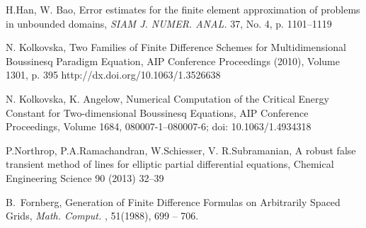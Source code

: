 \documentclass[12pt]{article}
\theoremstyle{theorem}
\theoremstyle{defi}
\begin{document}
\begin{thebibliography}{99}
  H.Han, W. Bao, Error estimates for the finite element approximation of problems in unbounded domains,  {\it SIAM J. NUMER. ANAL.} 37, No. 4, p. 1101–1119

 N. Kolkovska, Two Families of Finite Difference Schemes for Multidimensional Boussinesq Paradigm Equation, AIP Conference Proceedings (2010), Volume 1301, p. 395 http://dx.doi.org/10.1063/1.3526638

 N. Kolkovska, K. Angelow, Numerical Computation of the Critical Energy Constant for Two-dimensional Boussinesq Equations,  AIP Conference Proceedings, Volume 1684, 080007-1–080007-6; doi: 10.1063/1.4934318

 P.Northrop, P.A.Ramachandran, W.Schiesser, V. R.Subramanian, A robust false transient method of lines for elliptic partial differential equations, Chemical Engineering Science 90 (2013) 32–39

B.~Fornberg, Generation of Finite Difference Formulas on Arbitrarily Spaced Grids, 
{\it  Math. Comput.} , 51(1988),  699 -- 706.

\end{thebibliography}
\end{document}
